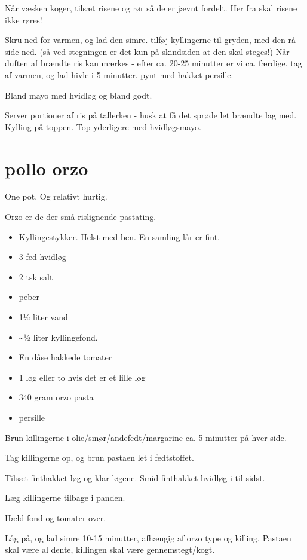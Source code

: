 \documentclass[
]{book}
\providecommand{\tightlist}{%
  \setlength{\itemsep}{0pt}\setlength{\parskip}{0pt}}
\begin{document}
Når væsken koger, tilsæt risene og rør så de er jævnt fordelt. Her fra skal risene ikke røres!

Skru ned for varmen, og lad den simre. tilføj kyllingerne til gryden, med den rå side ned. (så ved stegningen
er det kun på skindsiden at den skal steges!) Når duften af brændte ris kan mærkes - efter ca. 20-25 minutter
er vi ca. færdige. tag af varmen, og lad hivle i 5 minutter. pynt med hakket persille.

Bland mayo med hvidløg og bland godt.

Server portioner af ris på tallerken - husk at få det sprøde let brændte lag med. Kylling på toppen.
Top yderligere med hvidløgsmayo.

\section{pollo orzo}\label{pollo-orzo}

One pot. Og relativt hurtig.

Orzo er de der små rislignende pastating.

\begin{itemize}
\tightlist
\item
  Kyllingestykker. Helst med ben. En samling lår er fint.
\item
  3 fed hvidløg
\item
  2 tsk salt
\item
  peber
\item
  1½ liter vand
\item
  \textasciitilde½ liter kyllingefond.
\item
  En dåse hakkede tomater
\item
  1 løg eller to hvis det er et lille løg
\item
  340 gram orzo pasta
\item
  persille
\end{itemize}

Brun killingerne i olie/smør/andefedt/margarine
ca. 5 minutter på hver side.

Tag killingerne op, og brun pastaen let i fedtstoffet.

Tilsæt finthakket løg og klar løgene. Smid finthakket hvidløg i til sidst.

Læg killingerne tilbage i panden.

Hæld fond og tomater over.

Låg på, og lad simre 10-15 minutter, afhængig af orzo type og killing.
Pastaen skal være al dente, killingen skal være gennemstegt/kogt.
\end{document}
